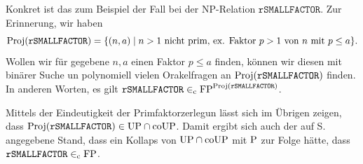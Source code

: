Konkret ist das zum Beispiel der Fall bei der NP-Relation $\mathtt{rSMALLFACTOR}$. Zur Erinnerung, wir haben
\[ \Proj(\mathtt{rSMALLFACTOR}) = \{ (n,a)\mid \text{$n>1$ nicht prim, ex. Faktor $p>1$ von $n$ mit $p\leq a$} \}. \]
Wollen wir für gegebene $n, a$ einen Faktor $p\leq a$ finden, können wir diesen mit binärer Suche un polynomiell vielen Orakelfragen an $\Proj(\mathtt{rSMALLFACTOR})$ finden.
In anderen Worten, es gilt $\mathtt{rSMALLFACTOR} \inc \FP^{\Proj(\mathtt{rSMALLFACTOR})}$.

Mittels der Eindeutigkeit der Primfaktorzerlegun lässt sich im Übrigen zeigen, dass $\Proj(\mathtt{rSMALLFACTOR})\in\UP\cap\coUP$.
Damit ergibt sich auch der auf S.~\pageref{page:lösbarkeit} angegebene Stand, dass ein Kollaps von $\UP\cap\coUP$ mit $\P$ zur Folge hätte, dass $\mathtt{rSMALLFACTOR}\inc\FP$.





